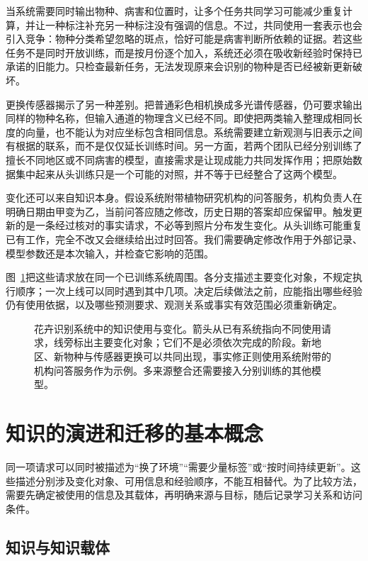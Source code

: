 当系统需要同时输出物种、病害和位置时，让多个任务共同学习可能减少重复计算，并让一种标注补充另一种标注没有强调的信息。不过，共同使用一套表示也会引入竞争：物种分类希望忽略的斑点，恰好可能是病害判断所依赖的证据。若这些任务不是同时开放训练，而是按月份逐个加入，系统还必须在吸收新经验时保持已承诺的旧能力。只检查最新任务，无法发现原来会识别的物种是否已经被新更新破坏。

更换传感器揭示了另一种差别。把普通彩色相机换成多光谱传感器，仍可要求输出同样的物种名称，但输入通道的物理含义已经不同。即使把两类输入整理成相同长度的向量，也不能认为对应坐标包含相同信息。系统需要建立新观测与旧表示之间有根据的联系，而不是仅仅延长训练时间。另一方面，若两个团队已经分别训练了擅长不同地区或不同病害的模型，直接需求是让现成能力共同发挥作用；把原始数据集中起来从头训练只是一个可能的对照，并不等于已经整合了这两个模型。

变化还可以来自知识本身。假设系统附带植物研究机构的问答服务，机构负责人在明确日期由甲变为乙，当前问答应随之修改，历史日期的答案却应保留甲。触发更新的是一条经过核对的事实请求，不必等到照片分布发生变化。从头训练可能重复已有工作，完全不改又会继续给出过时回答。我们需要确定修改作用于外部记录、模型参数还是本次输入，并检查它影响的范围。

图~\ref{fig:ket-overview-scenarios}把这些请求放在同一个已训练系统周围。各分支描述主要变化对象，不规定执行顺序；一次上线可以同时遇到其中几项。决定后续做法之前，应能指出哪些经验仍有使用依据，以及哪些预测要求、观测关系或事实有效范围必须重新确定。

\begin{figure}[htbp]
  \centering
  
  \caption{花卉识别系统中的知识使用与变化。箭头从已有系统指向不同使用请求，线旁标出主要变化对象；它们不是必须依次完成的阶段。新地区、新物种与传感器更换可以共同出现，事实修正则使用系统附带的机构问答服务作为示例。多来源整合还需要接入分别训练的其他模型。}
  \label{fig:ket-overview-scenarios}
\end{figure}

\section{知识的演进和迁移的基本概念}
\label{sec:ket-overview-concepts}

同一项请求可以同时被描述为“换了环境”“需要少量标签”或“按时间持续更新”。这些描述分别涉及变化对象、可用信息和经验顺序，不能互相替代。为了比较方法，需要先确定被使用的信息及其载体，再明确来源与目标，随后记录学习关系和访问条件。

\subsection{知识与知识载体}
\label{sec:ket-overview-carriers}

